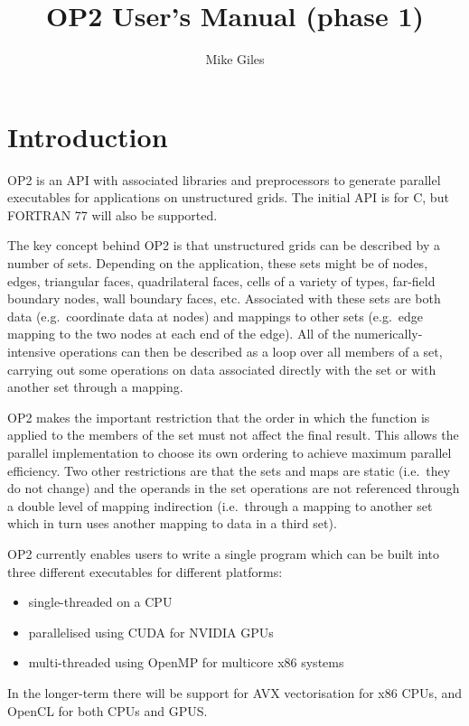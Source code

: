 \documentclass[11pt]{article}
\begin{document}
\title{OP2 User's Manual (phase 1)}
\author{Mike Giles}
\maketitle


\newpage
\section{Introduction}

OP2 is an API with associated libraries and preprocessors to 
generate parallel executables for applications on unstructured grids.  
The initial API is for C, but FORTRAN 77 will also be supported.

The key concept behind OP2 is that unstructured grids can be described
by a number of sets.  Depending on the application, these sets might
be of nodes, edges, triangular faces, quadrilateral faces, cells of
a variety of types, far-field boundary nodes, wall boundary faces, etc.
Associated with these sets are both data (e.g.~coordinate data at 
nodes) and mappings to other sets (e.g.~edge mapping to the two 
nodes at each end of the edge).  All of the numerically-intensive
operations can then be described as a loop over all members of a set, 
carrying out some operations on data associated directly
with the set or with another set through a mapping.   

OP2 makes the important restriction that the order in which the
function is applied to the members of the set must not affect the
final result.  This allows the parallel implementation to choose
its own ordering to achieve maximum parallel efficiency. 
Two other restrictions are that the sets and maps are static 
(i.e.~they do not change) and the operands in the set operations 
are not referenced through a double level of mapping indirection 
(i.e.~through a mapping to another set which in turn uses another 
mapping to data in a third set).

OP2 currently enables users to write a single program which can be 
built into three different executables for different platforms:
\begin{itemize}
\item
single-threaded on a CPU
\item
parallelised using CUDA for NVIDIA GPUs
\item
multi-threaded using OpenMP for multicore x86 systems
\end{itemize}

In the longer-term there will be support for AVX vectorisation for
x86 CPUs, and OpenCL for both CPUs and GPUS.
\end{document}
